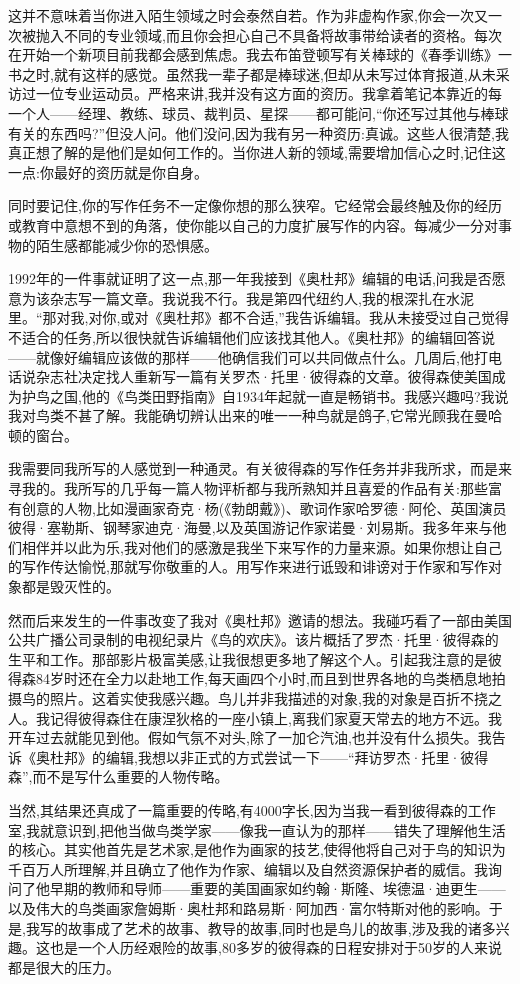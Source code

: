 这并不意味着当你进入陌生领域之时会泰然自若。作为非虚构作家,你会一次又一次被抛入不同的专业领域,而且你会担心自己不具备将故事带给读者的资格。每次在开始一个新项目前我都会感到焦虑。我去布笛登顿写有关棒球的《春季训练》一书之时,就有这样的感觉。虽然我一辈子都是棒球迷,但却从未写过体育报道,从未采访过一位专业运动员。严格来讲,我并没有这方面的资历。我拿着笔记本靠近的每一个人——经理、教练、球员、裁判员、星探——都可能问,“你还写过其他与棒球有关的东西吗?”但没人问。他们没问,因为我有另一种资历:真诚。这些人很清楚,我真正想了解的是他们是如何工作的。当你进人新的领域,需要增加信心之时,记住这一点:你最好的资历就是你自身。

同时要记住,你的写作任务不一定像你想的那么狭窄。它经常会最终触及你的经历或教育中意想不到的角落，使你能以自己的力度扩展写作的内容。每减少一分对事物的陌生感都能减少你的恐惧感。

1992年的一件事就证明了这一点,那一年我接到《奥杜邦》编辑的电话,问我是否愿意为该杂志写一篇文章。我说我不行。我是第四代纽约人,我的根深扎在水泥里。“那对我,对你,或对《奥杜邦》都不合适,”我告诉编辑。我从未接受过自己觉得不适合的任务,所以很快就告诉编辑他们应该找其他人。《奥杜邦》的编辑回答说——就像好编辑应该做的那样——他确信我们可以共同做点什么。几周后,他打电话说杂志社决定找人重新写一篇有关罗杰·托里·彼得森的文章。彼得森使美国成为护鸟之国,他的《鸟类田野指南》自1934年起就一直是畅销书。我感兴趣吗?我说我对鸟类不甚了解。我能确切辨认出来的唯一一种鸟就是鸽子,它常光顾我在曼哈顿的窗台。

我需要同我所写的人感觉到一种通灵。有关彼得森的写作任务并非我所求，而是来寻我的。我所写的几乎每一篇人物评析都与我所熟知并且喜爱的作品有关:那些富有创意的人物,比如漫画家奇克·杨(《勃朗戴》)、歌词作家哈罗德·阿伦、英国演员彼得·塞勒斯、钢琴家迪克·海曼,以及英国游记作家诺曼·刘易斯。我多年来与他们相伴并以此为乐,我对他们的感激是我坐下来写作的力量来源。如果你想让自己的写作传达愉悦,那就写你敬重的人。用写作来进行诋毁和诽谤对于作家和写作对象都是毁灭性的。

然而后来发生的一件事改变了我对《奥杜邦》邀请的想法。我碰巧看了一部由美国公共广播公司录制的电视纪录片《鸟的欢庆》。该片概括了罗杰·托里·彼得森的生平和工作。那部影片极富美感,让我很想更多地了解这个人。引起我注意的是彼得森84岁时还在全力以赴地工作,每天画四个小时,而且到世界各地的鸟类栖息地拍摄鸟的照片。这着实使我感兴趣。鸟儿并非我描述的对象,我的对象是百折不挠之人。我记得彼得森住在康涅狄格的一座小镇上,离我们家夏天常去的地方不远。我开车过去就能见到他。假如气氛不对头,除了一加仑汽油,也并没有什么损失。我告诉《奥杜邦》的编辑,我想以非正式的方式尝试一下——“拜访罗杰·托里·彼得森”,而不是写什么重要的人物传略。

当然,其结果还真成了一篇重要的传略,有4000字长,因为当我一看到彼得森的工作室,我就意识到,把他当做鸟类学家——像我一直认为的那样——错失了理解他生活的核心。其实他首先是艺术家,是他作为画家的技艺,使得他将自己对于鸟的知识为千百万人所理解,并且确立了他作为作家、编辑以及自然资源保护者的威信。我询问了他早期的教师和导师——重要的美国画家如约翰·斯隆、埃德温·迪更生——以及伟大的鸟类画家詹姆斯·奥杜邦和路易斯·阿加西·富尔特斯对他的影响。于是,我写的故事成了艺术的故事、教导的故事,同时也是鸟儿的故事,涉及我的诸多兴趣。这也是一个人历经艰险的故事,80多岁的彼得森的日程安排对于50岁的人来说都是很大的压力。

